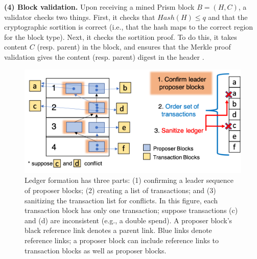 \noindent \textbf{(4) Block validation.}
Upon  receiving a mined Prism block $B=(H,C)$, a validator checks two things. 
First, it  checks that $Hash( H) \leq q$ and that the cryptographic sortition is correct  (i.e., that the hash  maps to the correct region for the block type).
Next, it checks the sortition proof.  
To do this, it takes content $C$ (resp. parent) in  the block, and ensures that the Merkle proof validation gives the content (resp. parent) digest in the header \cite{merkle}. 


\begin{figure}
   \centering
   \includegraphics[width=\linewidth]{figures/ledger_generation.png}
   \vspace{-5mm}
    \caption{\small Ledger formation has three parts:  
   (1)  confirming a leader  sequence of proposer blocks;
   (2)  creating a list  of transactions;
   and (3) sanitizing the transaction list for conflicts. 
   In this figure, each transaction  block has only one transaction; suppose transactions  (c) and (d) are inconsistent (e.g., a double spend).
   A proposer block's black reference link denotes a parent link. 
    Blue links denote reference links; a proposer block can include reference links to transaction blocks as well as proposer blocks.}
   \label{fig:leader_ledger}
    \vspace{-5mm}

 \end{figure}


